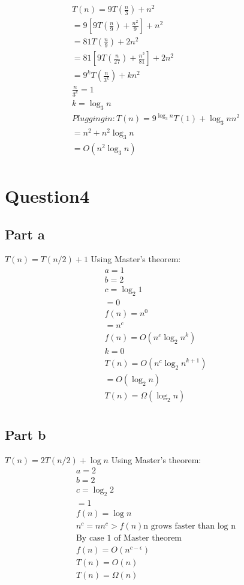 \documentclass{article}
\begin{document}
\begin{align}
T(n)=9T(\frac{n}{3}) + n^2\\
    =9[9T(\frac{n}{9}) + \frac{n^2}{9}] + n^2\\
    =81T(\frac{n}{9})+ 2n^2\\
    =81[9T(\frac{n}{27})+\frac{n^2}{81}]+2n^2\\
    =9^kT(\frac{n}{3^k}) + kn^2\\
\frac{n}{3^k}=1\\
k=\log_3 n\\
Plugging in:
T(n)=9^{\log_3 n}T(1)+{\log_3 n}n^2\\
    =n^2 + n^2{\log_3 n}\\
    =O(n^2{\log_3 n})\\
\end{align}

\section*{Question4}

\subsection*{Part a}

 $T(n)=T(n/2)+1$
Using Master's theorem:
\begin{align}
a=1\\
b=2\\
c=\log_2 1\\
 =0\\
f(n)=n^0\\
    =n^c\\
f(n)=O(n^c {\log_2 n}^k)\\
k=0\\
T(n)=O(n^c {\log_2 n}^{k+1})\\
    =O(\log_2 n)\\
T(n)=\Omega(\log_2 n)\\
\end{align}

\subsection*{Part b}

 $T(n)=2T(n/2)+\log n$
Using Master's theorem:
\begin{align}
a=2\\
b=2\\
c=\log_2 2\\
 =1\\
f(n)=\log n\\
n^c=n
n^c>f(n) \text{n grows faster than log n}\\
\text{By case 1 of Master theorem}\\
f(n)=O(n^{c-\epsilon})\\
T(n)=O(n)\\
T(n)=\Omega(n)\\
\end{align}
\end{document}
